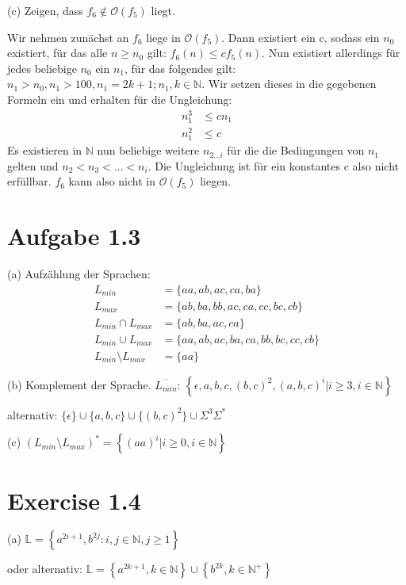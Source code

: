 \documentclass{article}
\begin{document}
\noindent { }

\noindent (c) Zeigen, dass $f_6 \notin \mathcal{O}(f_5)$ liegt. 

Wir nehmen zun\"achst an $f_6$ liege in $\mathcal{O}(f_5)$. Dann existiert ein c, sodass ein $n_0$ existiert, f\"ur das alle $n \geq n_0$ gilt: $f_6(n)\leq cf_5(n)$. Nun existiert allerdings f\"ur jedes beliebige $n_0$ ein $n_1$, f\"ur das folgendes gilt: $n_1>n_0,n_1>100,n_1 =2k+1; n_1,k \in \mathbb{N}$. Wir setzen dieses in die gegebenen Formeln ein und erhalten f\"ur die Ungleichung:
\begin{align*}
n_1^3 &\leq cn_1 \\
n_1^2 &\leq c
\end{align*}
\noindent Es existieren in $\mathbb{N}$ nun beliebige weitere $n_{2...i}$ f\"ur die die Bedingungen von $n_1$ gelten und $n_2<n_3<...<n_i$. Die Ungleichung ist f\"ur ein konstantes c also nicht erf\"ullbar. $f_6$ kann also nicht in $\mathcal{O}(f_5)$ liegen.

\section*{Aufgabe 1.3}

\noindent (a) Aufz\"ahlung der Sprachen:
\begin{align*}
L_{min} &= \{aa,ab,ac,ca,ba\}\\
L_{max} &= \{ab,ba,bb,ac,ca,cc,bc,cb\}\\
L_{min}\cap L_{max} &= \{ab,ba,ac,ca\}\\
L_{min}\cup L_{max} &= \{aa,ab,ac,ba,ca,bb,bc,cc,cb\}\\
L_{min}\setminus L_{max} &= \{aa\}
\end{align*}

\noindent (b) Komplement der Sprache. $\overline{L_{min}}$:
$\left\{\epsilon, a, b, c, (b,c)^2, (a,b,c)^i | i\geq 3,i\in \mathbb{N}\right\} $

alternativ: $\{\epsilon\}\cup\{a,b,c\}\cup\{(b,c)^2\}\cup\Sigma^3\Sigma^*$

\noindent (c) $(L_{min} \setminus L_{max})^*=\left\{(aa)^i | i\geq 0,i\in \mathbb{N} \right\}$

\section*{Exercise 1.4}
\noindent (a) $\mathbb{L}=\left\{a^{2i+1}, b^{2j}: i,j \in \mathbb{N}, j\geq 1 \right\}$ 

oder alternativ: $\mathbb{L}=\left\{a^{2k+1}, k \in \mathbb{N} \right\} \cup \left\{b^{2k}, k \in \mathbb{N}^+ \right\}$
\end{document}

